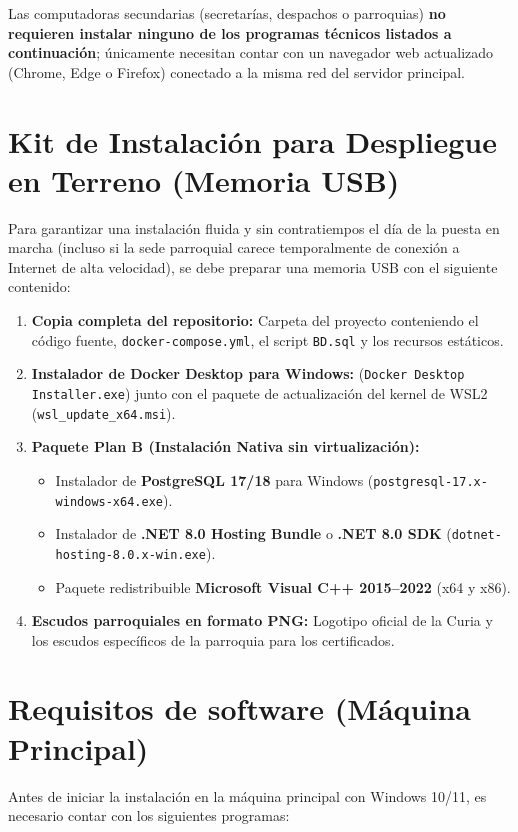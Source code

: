 \begin{nota}
Las computadoras secundarias (secretarías, despachos o parroquias) \textbf{no requieren instalar ninguno de los programas técnicos listados a continuación}; únicamente necesitan contar con un navegador web actualizado (Chrome, Edge o Firefox) conectado a la misma red del servidor principal.
\end{nota}

\section{Kit de Instalación para Despliegue en Terreno (Memoria USB)}
Para garantizar una instalación fluida y sin contratiempos el día de la puesta en marcha (incluso si la sede parroquial carece temporalmente de conexión a Internet de alta velocidad), se debe preparar una memoria USB con el siguiente contenido:

\begin{enumerate}
    \item \textbf{Copia completa del repositorio:} Carpeta del proyecto conteniendo el código fuente, \texttt{docker-compose.yml}, el script \texttt{BD.sql} y los recursos estáticos.
    \item \textbf{Instalador de Docker Desktop para Windows:} (\texttt{Docker Desktop Installer.exe}) junto con el paquete de actualización del kernel de WSL2 (\texttt{wsl\_update\_x64.msi}).
    \item \textbf{Paquete Plan B (Instalación Nativa sin virtualización):}
    \begin{itemize}
        \item Instalador de \textbf{PostgreSQL 17/18} para Windows (\texttt{postgresql-17.x-windows-x64.exe}).
        \item Instalador de \textbf{.NET 8.0 Hosting Bundle} o \textbf{.NET 8.0 SDK} (\texttt{dotnet-hosting-8.0.x-win.exe}).
        \item Paquete redistribuible \textbf{Microsoft Visual C++ 2015--2022} (x64 y x86).
    \end{itemize}
    \item \textbf{Escudos parroquiales en formato PNG:} Logotipo oficial de la Curia y los escudos específicos de la parroquia para los certificados.
\end{enumerate}

\section{Requisitos de software (Máquina Principal)}
Antes de iniciar la instalación en la máquina principal con Windows 10/11, es necesario contar con los siguientes programas:

